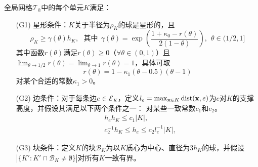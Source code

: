 \documentclass[notheorems,serif]{beamer}
\begin{document}
\begin{frame}[allowframebreaks]
\begin{assumption}[单元形状假设]
    \label{assump_polygon}
全局网格$\mathcal{T}_h$中的每个单元$K$满足：
\begin{itemize}
\item[(G1)] \label{asp:polygonG1} 星形条件：$K$关于半径为$\rho_K$的球是星形的，且
\begin{equation}
\label{rho_cont}
\rho_K \ge \gamma(\theta) h_K, ~~~ \text{其中} ~~ \gamma(\theta) = \exp\left( \frac{ 1 + \kappa_0 - r(\theta) }{2(1-\theta)} \right), ~~ \theta\in(1/2,1]
\end{equation}
其中函数$r(\theta)$满足$r(\theta)\ge 0$（$\forall \theta \in(0,1)$）且$\lim_{\theta\rightarrow 1/2}r(\theta) = \lim_{\theta\rightarrow1}r(\theta) = 1$，具体可取
\begin{equation}
\label{rho_cont_1}
r(\theta) = 1 - \kappa_1 (\theta-0.5)(\theta-1)
\end{equation}
对某个合适的常数$\kappa_1>0$。
\end{itemize}
\end{assumption}
\end{frame}

\begin{frame}
\begin{continue}
\begin{itemize}
\item[(G2)] \label{asp:polygonG2} 边条件：对于每条边$e\in
    \mathcal{E}_K$，定义$l_e = \max_{\mathbf{x} \in
    K}\operatorname{dist}(\mathbf{x},e)$为$e$对$K$的支撑高度，并假设其满足以下两个条件之一：
对某些一致常数$c_1$和$c_2$。
\begin{subequations}
\label{edge_cond}
\begin{align}
& h_eh_K \le c_1 |K|,  \label{edge_cond_eq1}  \\
&  c^{-1}_2 h_K \le  h_e  \le c_2 l^{-1}_e |K|, \label{edge_cond_eq2}
\end{align}
\end{subequations}
\item[(G3)] \label{asp:polygonG3} 块条件：定义$K$的块$\mathcal{B}_K$为以$K$质心为中心、直径为$3h_K$的球，并假设$|\{ K': K'\cap \mathcal{B}_K\neq\emptyset  \}|$对所有$K$一致有界。
\end{itemize}
\end{continue}
\end{frame}
\end{document}
